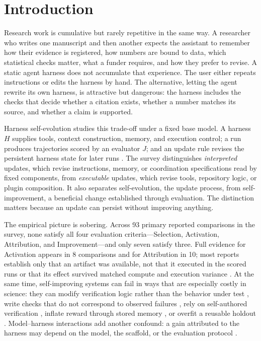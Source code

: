 \section{Introduction}
\label{sec:intro}

Research work is cumulative but rarely repetitive in the same way. A researcher who writes one manuscript and then another expects the assistant to remember how their evidence is registered, how numbers are bound to data, which statistical checks matter, what a funder requires, and how they prefer to revise. A static agent harness does not accumulate that experience. The user either repeats instructions or edits the harness by hand. The alternative, letting the agent rewrite its own harness, is attractive but dangerous: the harness includes the checks that decide whether a citation exists, whether a number matches its source, and whether a claim is supported.

Harness self-evolution studies this trade-off under a fixed base model. A harness $H$ supplies tools, context construction, memory, and execution control; a run produces trajectories scored by an evaluator $J$; and an update rule revises the persistent harness state for later runs \citep{wei2026harnessrsi,wei2026selfevolvingagentharness}. The survey distinguishes \emph{interpreted} updates, which revise instructions, memory, or coordination specifications read by fixed components, from \emph{executable} updates, which revise tools, repository logic, or plugin composition. It also separates self-evolution, the update process, from self-improvement, a beneficial change established through evaluation. The distinction matters because an update can persist without improving anything.

The empirical picture is sobering. Across 93 primary reported comparisons in the survey, none satisfy all four evaluation criteria---Selection, Activation, Attribution, and Improvement---and only seven satisfy three. Full evidence for Activation appears in 8 comparisons and for Attribution in 10; most reports establish only that an artifact was available, not that it executed in the scored runs or that its effect survived matched compute and execution variance \citep{wei2026harnessrsi}. At the same time, self-improving systems can fail in ways that are especially costly in science: they can modify verification logic rather than the behavior under test \citep{wang2026tampering}, write checks that do not correspond to observed failures \citep{wang2026phantom}, rely on self-authored verification \citep{guo2026selfverification}, inflate reward through stored memory \citep{asadolahi2026inflation}, or overfit a reusable holdout \citep{dwork2015reusable,cawley2010overfitting}. Model--harness interactions add another confound: a gain attributed to the harness may depend on the model, the scaffold, or the evaluation protocol \citep{li2026rightfit,tian2026ceiling}.

